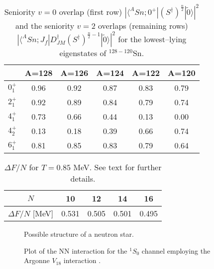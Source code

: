 \documentclass[rmp,preprint,aps,floatfix]{revtex4}
\begin{document}
\begin{table}[htbp]
\caption{ Seniority $v=0$ overlap (first row)  
         $|\langle ^{A}Sn;0^{+}|(S^{\dagger})^{\frac{n}{2}}| 
         \tilde{0} \rangle |^{2}$ and the seniority $v=2$ 
         overlaps (remaining rows) $|\langle ^{A}Sn ;J_{f}|
         D^{\dagger}_{JM}(S^{\dagger})^{\frac{n}{2} - 1}| 
         \tilde{0} \rangle |^{2}$ for the lowest--lying eigenstates 
         of $^{128-120}$Sn.\label{tab:seniority}}
\begin{center}
\begin{tabular}{cccccc}
\hline
 & A=128 & A=126 & A=124 & A=122 & A=120 \\ 
\hline
$0^{+}_{1}$ & 0.96 & 0.92 & 0.87 & 0.83 & 0.79 \\ 
$2^{+}_{1}$ & 0.92 & 0.89 & 0.84 & 0.79 & 0.74 \\ 
$4^{+}_{1}$ & 0.73 & 0.66 & 0.44 & 0.13 & 0.00 \\ 
$4^{+}_{2}$ & 0.13 & 0.18 & 0.39 & 0.66 & 0.74 \\
$6^{+}_{1}$ & 0.81 & 0.85 & 0.83 & 0.79 & 0.64 \\
\hline
\end{tabular}
\end{center}
\end{table}

\begin{table}[b]
\caption{ $\Delta F/N$ for $T=0.85$ MeV. 
See text for further details. \label{tab:free_energy10_16}} 
\begin{tabular}{ccccc}\hline
$N$ & 10 & 12 & 14& 16 \\ \hline
$\Delta F/N$ [MeV]   &0.531 & 0.505 & 0.501 & 0.495 \\\hline
\end{tabular} 

\end{table}



\begin{figure}
   \caption{Possible structure of a neutron star.}
   \label{fig:sec1fig_phases}
\end{figure}

\begin{figure}
\caption{Plot of the NN interaction for the 
         $^1S_0$ channel employing the Argonne $V_{18}$ interaction
         \cite{v18}.
             \label{fig:singletspot_sec2}}
\end{figure}
\end{document}
